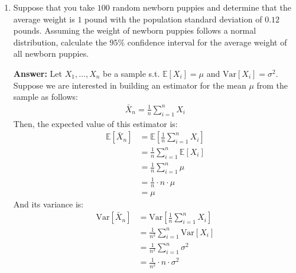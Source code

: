 \documentclass{article}
\newenvironment{QandA}{\begin{enumerate}[label=\arabic*.]}{\end{enumerate}}
\newenvironment{answer}{\par\normalfont \textbf{Answer:}}{}
\newcommand{\Exp}[1]{\mathbb{E}\left[ #1 \right]}
\newcommand{\Vari}[1]{\text{Var}\left[ #1 \right]}
\begin{document}
\begin{QandA}
\begin{answer}
        (Source: \href{https://stats.stackexchange.com/questions/12842/covariance-and-independence}{StackExchange})\\\\
        Quick proof for $\Exp{X^3} = 0$: Since $X \sim N(0, \sigma^2)$, this means that the expectation is symmetric wrt X. Then:
        \begin{align*}
            \Exp{X^3} &= \Exp{(-X)^3} = \Exp{-X^3} = - \Exp{X^3} \\
            \implies \Exp{X^3} &= 0
        \end{align*}
        
    \end{answer}

    \item Suppose that you take $100$ random newborn puppies and determine that the average weight is $1$ pound with the population standard deviation of $0.12$ pounds. Assuming the weight of newborn puppies follows a normal distribution, calculate the $95\%$ confidence interval for the average weight of all newborn puppies.
    \begin{answer}
        Let $X_1, \ldots, X_n$ be a sample s.t. $\Exp{X_i} = \mu$ and $\Vari{X_i} = \sigma^2$. Suppose we are interested in building an estimator for the mean $\mu$ from the sample as follows:
        \begin{align*}
            \bar{X}_n = \frac{1}{n} \sum_{i=1}^n X_i
        \end{align*}
        Then, the expected value of this estimator is:
        \begin{align*}
            \Exp{\bar{X}_n} &= \Exp{\frac{1}{n} \sum_{i=1}^n X_i} \\
            &= \frac{1}{n} \sum_{i=1}^n \Exp{X_i} \\
            &= \frac{1}{n} \sum_{i=1}^n \mu \\
            &= \frac{1}{n} \cdot n \cdot \mu \\
            &= \mu
        \end{align*}
        And its variance is:
        \begin{align*}
            \Vari{\bar{X}_n} &= \Vari{\frac{1}{n} \sum_{i=1}^n X_i} \\
            &= \frac{1}{n^2} \sum_{i=1}^n \Vari{X_i} \\
            &= \frac{1}{n^2} \sum_{i=1}^n \sigma^2 \\
            &= \frac{1}{n^2} \cdot n \cdot \sigma^2 \\

\end{align*}
\end{answer}
\end{QandA}
\end{document}
